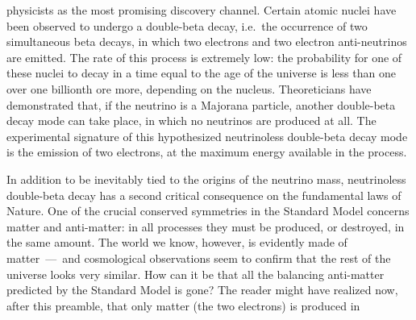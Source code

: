 physicists as the most promising discovery channel. Certain atomic nuclei have been
observed to undergo a double-beta decay, i.e.~the occurrence of two simultaneous beta
decays, in which two electrons and two electron anti-neutrinos are emitted. The rate of
this process is extremely low: the probability for one of these nuclei to decay in a time
equal to the age of the universe is less than one over one billionth ore more, depending
on the nucleus. Theoreticians have demonstrated that, if the neutrino is a Majorana
particle, another double-beta decay mode can take place, in which no neutrinos are
produced at all. The experimental signature of this hypothesized neutrinoless double-beta
decay mode is the emission of two electrons, at the maximum energy available in the
process.
\newpar
\begin{center}
\end{center}
In addition to be inevitably tied to the origins of the neutrino mass, neutrinoless
double-beta decay has a second critical consequence on the fundamental laws of Nature. One
of the crucial conserved symmetries in the Standard Model concerns matter and anti-matter:
in all processes they must be produced, or destroyed, in the same amount.  The world we
know, however, is evidently made of matter~---~and cosmological observations seem to
confirm that the rest of the universe looks very similar. How can it be that all the
balancing anti-matter predicted by the Standard Model is gone? The reader might have
realized now, after this preamble, that only matter (the two electrons) is produced in
